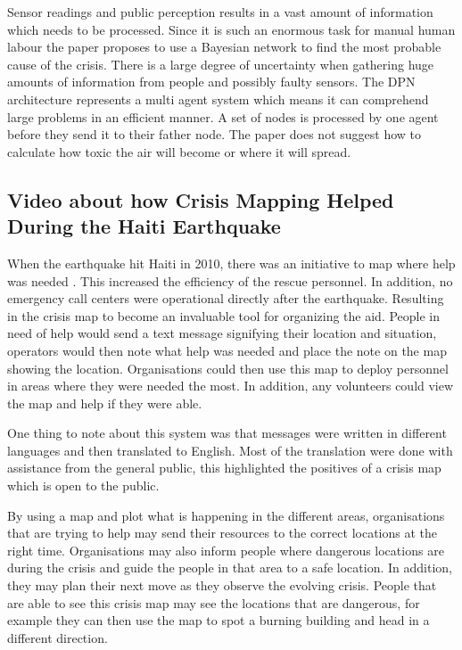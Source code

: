 Sensor readings and public perception results in a vast amount of information which needs to be processed. Since it is such an enormous task for manual human labour the paper proposes to use a Bayesian network to find the most probable cause of the crisis. There is a large degree of uncertainty when gathering huge amounts of information from people and possibly faulty sensors. The DPN architecture represents a multi agent system which means it can comprehend large problems in an efficient manner. A set of nodes is processed by one agent before they send it to their father node. The paper does not suggest how to calculate how toxic the air will become or where it will spread.  

\subsection{Video about how Crisis Mapping Helped During the Haiti Earthquake}

When the earthquake hit Haiti in 2010, there was an initiative to map where help was needed \cite{usha}. This increased the efficiency of the rescue personnel. In addition, no emergency call centers were operational directly after the earthquake. Resulting in the crisis map to become an invaluable tool for organizing the aid. People in need of help would send a text message signifying their location and situation, operators would then note what help was needed and place the note on the map showing the location. Organisations could then use this map to deploy personnel in areas where they were needed the most. In addition, any volunteers could view the map and help if they were able.

One thing to note about this system was that messages were written in different languages and then translated to English. Most of the translation were done with assistance from the general public, this highlighted the positives of a crisis map which is open to the public.

By using a map and plot what is happening in the different areas, organisations that are trying to help may send their resources to the correct locations at the right time. Organisations may also inform people where dangerous locations are during the crisis and guide the people in that area to a safe location. In addition, they may plan their next move as they observe the evolving crisis. People that are able to see this crisis map may see the locations that are dangerous, for example they can then use the map to spot a burning building and head in a different direction. 

